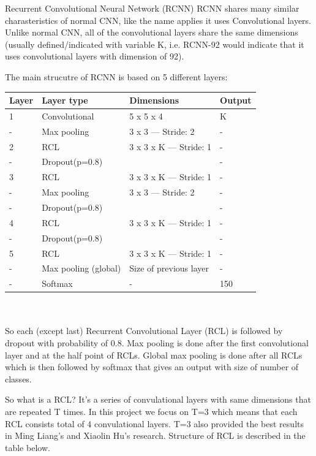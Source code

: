 \documentclass[article,11pt]{article}
\begin{document}
\begin{definition}{{\small Recurrent Convolutional Neural Network (RCNN)}}{}
    RCNN shares many similar charasteristics of normal CNN, like the name applies it uses Convolutional layers. Unlike normal CNN, all of the
    convolutional layers share the same dimensions (usually defined/indicated with variable K, i.e. RCNN-92 would indicate that it uses convolutional layers with
    dimension of 92).

    The main strucutre of RCNN is based on 5 different layers:
    \begin{tabular}{| l | l | l | l |}
        \hline
        \bf Layer & \bf Layer type & \bf Dimensions & \bf Output \\
        \hline			
        1 & Convolutional & 5 x 5 x 4 & K \\
        - & Max pooling & 3 x 3 — Stride: 2 & - \\
        2 & RCL & 3 x 3 x K — Stride: 1& -\\
        - & Dropout(p=0.8) & & - \\
        3 & RCL & 3 x 3 x K — Stride: 1 & -\\
        - & Max pooling & 3 x 3 — Stride: 2 & - \\
        - & Dropout(p=0.8) & & -\\
        4 & RCL & 3 x 3 x K — Stride: 1 & -\\
        - & Dropout(p=0.8) & & -\\
        5 & RCL & 3 x 3 x K — Stride: 1& -\\
        - & Max pooling (global) & Size of previous layer & - \\
        - & Softmax & - & 150 \\
        \hline  
    \end{tabular}\\ \\
    So each (except last) Recurrent Convolutional Layer (RCL) is followed by dropout with probability of 0.8. Max pooling is done after the first convolutional layer and at the half point of
    RCLs. Global max pooling is done after all RCLs which is then followed by softmax that gives an output with size of number of classes.

    So what is a RCL? It's a series of convulational layers with same dimensions that are repeated T times. In this project we focus on T=3 which
    means that each RCL consists total of 4 convulational layers. T=3 also provided the best results in Ming Liang's and Xiaolin Hu's research. Structure of RCL is described in the
    table below.\\

\end{definition}
\end{document}

